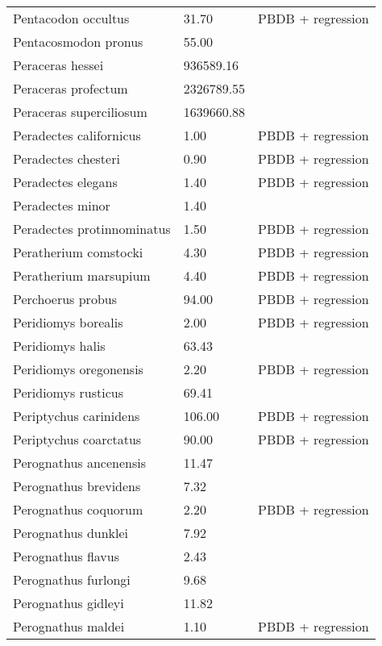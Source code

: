 \begin{longtable}{p{} p{} p{}}
    Pentacodon occultus & 31.70 & PBDB + regression \\ 
    Pentacosmodon pronus & 55.00 & \cite{Wilson2012} \\ 
    Peraceras hessei & 936589.16 & \cite{Tomiya2013} \\ 
    Peraceras profectum & 2326789.55 & \cite{Tomiya2013} \\ 
    Peraceras superciliosum & 1639660.88 & \cite{Tomiya2013} \\ 
    Peradectes californicus & 1.00 & PBDB + regression \\ 
    Peradectes chesteri & 0.90 & PBDB + regression \\ 
    Peradectes elegans & 1.40 & PBDB + regression \\ 
    Peradectes minor & 1.40 & \cite{Taylor1976} \\ 
    Peradectes protinnominatus & 1.50 & PBDB + regression \\ 
    Peratherium comstocki & 4.30 & PBDB + regression \\ 
    Peratherium marsupium & 4.40 & PBDB + regression \\ 
    Perchoerus probus & 94.00 & PBDB + regression \\ 
    Peridiomys borealis & 2.00 & PBDB + regression \\ 
    Peridiomys halis & 63.43 & \cite{Tomiya2013} \\ 
    Peridiomys oregonensis & 2.20 & PBDB + regression \\ 
    Peridiomys rusticus & 69.41 & \cite{Tomiya2013} \\ 
    Periptychus carinidens & 106.00 & PBDB + regression \\ 
    Periptychus coarctatus & 90.00 & PBDB + regression \\ 
    Perognathus ancenensis & 11.47 & \cite{Tomiya2013} \\ 
    Perognathus brevidens & 7.32 & \cite{Tomiya2013} \\ 
    Perognathus coquorum & 2.20 & PBDB + regression \\ 
    Perognathus dunklei & 7.92 & \cite{Tomiya2013} \\ 
    Perognathus flavus & 2.43 & \cite{Smith2004} \\ 
    Perognathus furlongi & 9.68 & \cite{Tomiya2013} \\ 
    Perognathus gidleyi & 11.82 & \cite{Tomiya2013} \\ 
    Perognathus maldei & 1.10 & PBDB + regression \\ 

\end{longtable}
